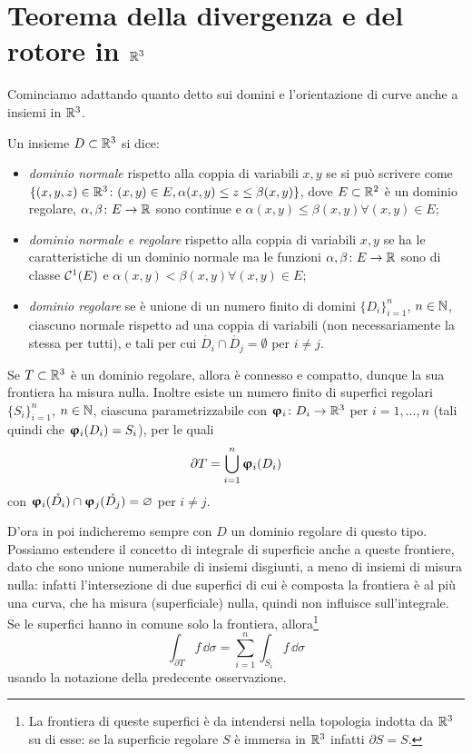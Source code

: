 \section{Teorema della divergenza e del rotore in $\mathbb{R}^3$}
Cominciamo adattando quanto detto sui domini e l'orientazione di curve anche a insiemi in $\mathbb{R}^3$.
\begin{definizione} \label{d:dominio-R3}
	Un insieme $D\subset\mathbb{R}^3$ si dice:
	\begin{itemize}
		\item \emph{dominio normale} rispetto alla coppia di variabili $x,y$ se si può scrivere come $\{(x,y,z)\in\mathbb{R}^3\colon(x,y)\in E, \alpha(x,y)\leq z\leq\beta(x,y)\}$, dove $E\subset\mathbb{R}^2$ è un dominio regolare, $\alpha,\beta\colon E\to\mathbb{R}$ sono continue e $\alpha(x,y)\leq\beta(x,y)\forall(x,y)\in E$;
		\item \emph{dominio normale e regolare} rispetto alla coppia di variabili $x,y$ se ha le caratteristiche di un dominio normale ma le funzioni $\alpha,\beta\colon E\to\mathbb{R}$ sono di classe $\mathcal{C}^{{1}}(E)$ e $\alpha(x,y)<\beta(x,y)\forall(x,y)\in E$;
		\item \emph{dominio regolare} se è unione di un numero finito di domini $\{D_i\}_{i=1}^n$, $n\in\mathbb{N}$, ciascuno normale rispetto ad una coppia di variabili (non necessariamente la stessa per tutti), e tali per cui $\mathring{D_i}\cap\mathring{D_j}=\emptyset$ per $i\neq j$.
	\end{itemize}
\end{definizione}
\begin{osservazione}
	Se $T\subset\mathbb{R}^3$ è un dominio regolare, allora è connesso e compatto, dunque la sua frontiera ha misura nulla.
	Inoltre esiste un numero finito di superfici regolari $\{S_i\}_{i=1}^n$, $n\in\mathbb{N}$, ciascuna parametrizzabile con $\bm{\upvarphi}_i\colon D_i\to\mathbb{R}^3$ per $i=1,\dots,n$ (tali quindi che $\bm{\upvarphi}_i(D_i)=S_i$), per le quali
	\begin{equation*}
		\partial T=\bigcup_{i=1}^n\bm{\upvarphi}_i(D_i)
	\end{equation*}
	con $\bm{\upvarphi}_i(\mathring{D_i})\cap\bm{\upvarphi}_j(\mathring{D_j})=\varnothing$ per $i\neq j$.
\end{osservazione}
D'ora in poi indicheremo sempre con $D$ un dominio regolare di questo tipo.
Possiamo estendere il concetto di integrale di superficie anche a queste frontiere, dato che sono unione numerabile di insiemi disgiunti, a meno di insiemi di misura nulla: infatti l'intersezione di due superfici di cui è composta la frontiera è al più una curva, che ha misura (superficiale) nulla, quindi non influisce sull'integrale.
Se le superfici hanno in comune solo la frontiera, allora\footnote{
	La frontiera di queste superfici è da intendersi nella topologia indotta da $\mathbb{R}^3$ su di esse: se la superficie regolare $S$ è immersa in $\mathbb{R}^3$ infatti $\partial S=S$.
}
\begin{equation*}
	\int_{\partial T}f\,\dd\sigma=\sum_{i=1}^n\int_{S_i}f\,\dd\sigma
\end{equation*}
usando la notazione della predecente osservazione.


